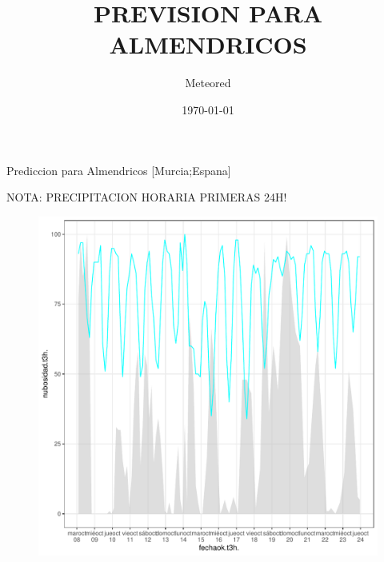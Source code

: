 \documentclass{article}\usepackage[]{graphicx}\usepackage[]{color}
\title{PREVISION PARA ALMENDRICOS}
\date{\today}
\author{Meteored}
\makeatletter
\def\maxwidth{ %
  \ifdim\Gin@nat@width>\linewidth
    \linewidth
  \else
    \Gin@nat@width
  \fi
}
\newenvironment{knitrout}{}{} %
\makeatother
\begin{document}
 
  
\maketitle %






Prediccion para Almendricos [Murcia;Espana]


NOTA: PRECIPITACION HORARIA PRIMERAS 24H!


\begin{figure}[h!]
\begin{knitrout}
\color{fgcolor}
\includegraphics[width=\maxwidth]{figure/Figprec-1} 

\end{knitrout}
\end{figure}
\end{document}
